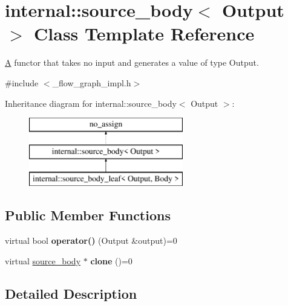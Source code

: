 \hypertarget{classinternal_1_1source__body}{}\section{internal\+:\+:source\+\_\+body$<$ Output $>$ Class Template Reference}
\label{classinternal_1_1source__body}


\hyperlink{structA}{A} functor that takes no input and generates a value of type Output.  




{\ttfamily \#include $<$\+\_\+flow\+\_\+graph\+\_\+impl.\+h$>$}

Inheritance diagram for internal\+:\+:source\+\_\+body$<$ Output $>$\+:\begin{figure}[H]
\begin{center}
\leavevmode
\includegraphics[height=3.000000cm]{classinternal_1_1source__body}
\end{center}
\end{figure}
\subsection*{Public Member Functions}
\begin{DoxyCompactItemize}
\item 
\hypertarget{classinternal_1_1source__body_aa63845ce1e5d5b9e618ad1ae382eded1}{}virtual bool {\bfseries operator()} (Output \&output)=0\label{classinternal_1_1source__body_aa63845ce1e5d5b9e618ad1ae382eded1}

\item 
\hypertarget{classinternal_1_1source__body_a0605e7cfd3278771a83454fee8fbf9d5}{}virtual \hyperlink{classinternal_1_1source__body}{source\+\_\+body} $\ast$ {\bfseries clone} ()=0\label{classinternal_1_1source__body_a0605e7cfd3278771a83454fee8fbf9d5}

\end{DoxyCompactItemize}


\subsection{Detailed Description}

